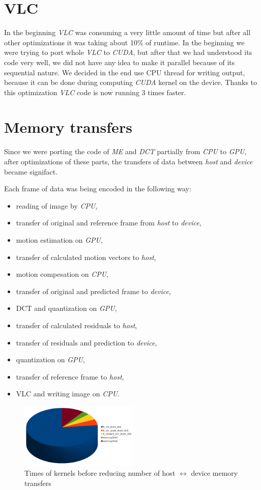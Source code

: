 \documentclass[11pt]{article}
\begin{document}
\section{VLC}
In the beginning \emph{VLC} was consuming a very little amount of time but after all other optimizations it was taking about 10\% of runtime. In the beginning we were trying to port whole \emph{VLC} to \emph{CUDA}, but after that we had understood its code very well, we did not have any idea to make it parallel because of its sequential nature. We decided in the end use CPU thread for writing output, because it can be done during computing \emph{CUDA} kernel on the device. Thanks to this optimization \emph{VLC} code is now running 3 times faster.

\section{Memory transfers}
Since we were porting the code of \emph{ME} and \emph{DCT} partially from 
\emph{CPU} to \emph{GPU}, after optimizations of these parts, the transfers
of data between \emph{host} and \emph{device} became signifact.

Each frame of data was being encoded in the following way:
\begin{itemize}
  \item reading of image by \emph{CPU},
  \item transfer of original and reference frame from \emph{host} to 
  \emph{device},
  \item motion estimation on \emph{GPU},
  \item transfer of calculated motion vectors to \emph{host},
  \item motion compesation on \emph{CPU},
  \item transfer of original and predicted frame to \emph{device},
  \item DCT and quantization on \emph{GPU},
  \item transfer of calculated residuals to \emph{host},
  \item transfer of residuals and prediction to \emph{device},
  \item quantization on \emph{GPU},
  \item transfer of reference frame to \emph{host},
  \item VLC and writing image on \emph{CPU}.
\end{itemize}
\pagebreak

\begin{figure}[h]
\centering
\includegraphics[width=0.5\textwidth]{images/before_all_device.png}
\caption{Times of kernels before reducing number of host $\leftrightarrow$ device memory transfers}
\end{figure}
\end{document}

